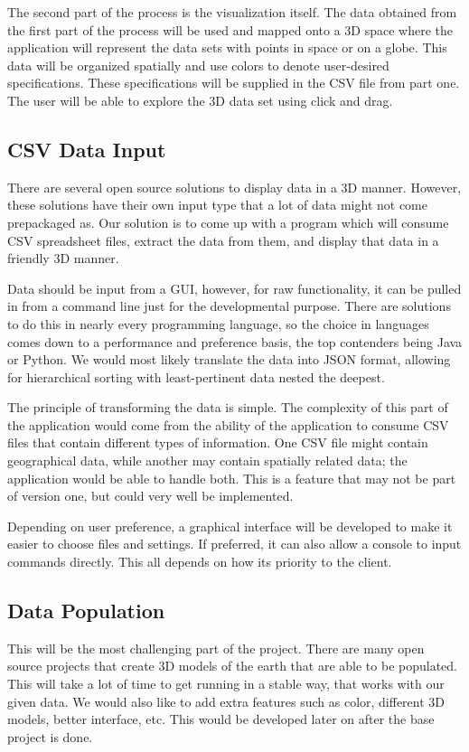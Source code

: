 \documentclass[journal,10pt,onecolumn,compsoc]{IEEEtran} \usepackage[margin=1.0in]{geometry} \usepackage{pdfpages}
\begin{document}
    The second part of the process is the visualization itself. The data obtained from the first part of the process will be used and mapped onto a 3D space where the application will represent the data sets with points in space or on a globe. This data will be organized spatially and use colors to denote user-desired specifications. These specifications will be supplied in the CSV file from part one. The user will be able to explore the 3D data set using click and drag.
\subsection{CSV Data Input}
There are several open source solutions to display data in a 3D manner. However, these solutions have their own input type that a lot of data might not come prepackaged as. Our solution is to come up with a program which will consume CSV spreadsheet files, extract the data from them, and display that data in a friendly 3D manner.

Data should be input from a GUI, however, for raw functionality, it can be pulled in from a command line just for the developmental purpose. There are solutions to do this in nearly every programming language, so the choice in languages comes down to a performance and preference basis, the top contenders being Java or Python. We would most likely translate the data into JSON format, allowing for hierarchical sorting with least-pertinent data nested the deepest.

The principle of transforming the data is simple. The complexity of this part of the application would come from the ability of the application to consume CSV files that contain different types of information. One CSV file might contain geographical data, while another may contain spatially related data; the application would be able to handle both. This is a feature that may not be part of version one, but could very well be implemented.

Depending on user preference, a graphical interface will be developed to make it easier to choose files and settings. If preferred, it can also allow a console to input commands directly. This all depends on how its priority to the client.

\subsection{Data Population}
This will be the most challenging part of the project. There are many open source projects that create 3D models of the earth that are able to be populated. This will take a lot of time to get running in a stable way, that works with our given data. We would also like to add extra features such as color, different 3D models, better interface, etc. This would be developed later on after the base project is done.
\end{document}
